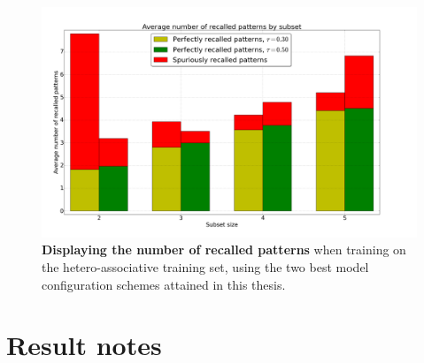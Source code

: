 \begin{figure}
    \centering
    \includegraphics[width=15cm]{fig/tr50_tr30}
    \caption{\textbf{Displaying the number of recalled patterns} when training on the hetero-associative training set, using the two best model configuration schemes attained in this thesis.}
    \label{fig:hetero-results}
\end{figure}



\section*{Result notes}

